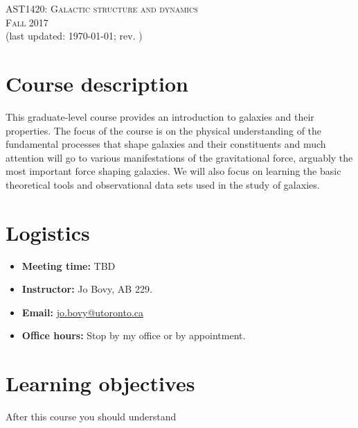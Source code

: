 \documentclass{article}
\begin{document}
\begin{center}
  \LARGE{\scshape{AST1420: Galactic structure and dynamics}}\\[5pt]
  \Large{\scshape{Fall 2017}}\\[5pt]
  \large{(last updated: \today; rev. \githash)}\\[25pt]
\end{center}

\section*{Course description}

This graduate-level course provides an introduction to galaxies and
their properties. The focus of the course is on the physical
understanding of the fundamental processes that shape galaxies and
their constituents and much attention will go to various
manifestations of the gravitational force, arguably the most important
force shaping galaxies. We will also focus on learning the basic
theoretical tools and observational data sets used in the study of
galaxies.

\section*{Logistics}

\begin{itemize}

  \item {\bf Meeting time:} TBD

  \item {\bf Instructor:} Jo Bovy, AB 229.

  \item {\bf Email:} \href{mailto:jo.bovy@utoronto.ca}{jo.bovy@utoronto.ca}

  \item {\bf Office hours:} Stop by my office or by appointment.

\end{itemize}

\section*{Learning objectives}

After this course you should understand
\end{document}
